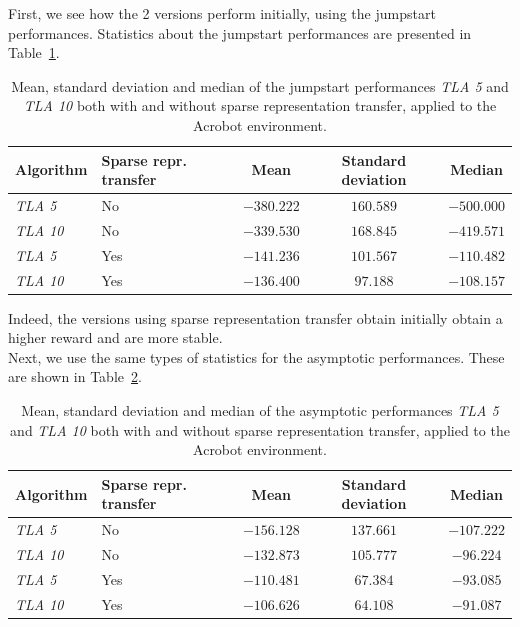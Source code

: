 First, we see how the 2 versions perform initially, using the jumpstart performances. Statistics about the jumpstart performances are presented in Table~\ref{tab:acrobot:sparse:stats}.
\begin{table}[htb]
    \centering
    \begin{tabular}{llccc}
    \hline
    Algorithm & Sparse repr. transfer & Mean & Standard deviation & Median \\
    \hline
       \textit{TLA 5} & No & $-380.222$ & $160.589$ & $-500.000$ \\
       \textit{TLA 10} & No & $-339.530$ & $168.845$ & $-419.571$ \\
       \textit{TLA 5} & Yes & $-141.236$ & $101.567$ & $-110.482$ \\
       \textit{TLA 10} & Yes & $\bm{-136.400}$ & $97.188$ & $\bm{-108.157}$ \\
    \hline
    \end{tabular}
    \caption{Mean, standard deviation and median of the jumpstart performances \textit{TLA 5} and \textit{TLA 10} both with and without sparse representation transfer, applied to the Acrobot environment.}
    \label{tab:acrobot:sparse:stats}
\end{table}
Indeed, the versions using sparse representation transfer obtain initially obtain a higher reward and are more stable.\\
Next, we use the same types of statistics for the asymptotic performances.
These are shown in Table~\ref{tab:acrobot:sparse:asymp:stats}.
\begin{table}[htb]
    \centering
    \begin{tabular}{llccc}
    \hline
    Algorithm & Sparse repr. transfer & Mean & Standard deviation & Median \\
    \hline
       \textit{TLA 5} & No & $-156.128$ & $137.661$ & $-107.222$ \\
       \textit{TLA 10} & No & $-132.873$ & $105.777$ & $-96.224$ \\
       \textit{TLA 5} & Yes & $-110.481$ & $67.384$ & $-93.085$ \\
       \textit{TLA 10} & Yes & $\bm{-106.626}$ & $64.108$ & $\bm{-91.087}$ \\
    \hline
    \end{tabular}
    \caption{Mean, standard deviation and median of the asymptotic performances \textit{TLA 5} and \textit{TLA 10} both with and without sparse representation transfer, applied to the Acrobot environment.}
    \label{tab:acrobot:sparse:asymp:stats}
\end{table}
